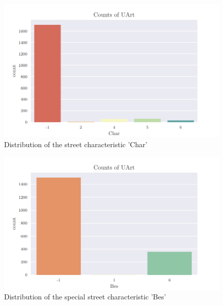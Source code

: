 \documentclass[a4paper,headsepline,footsepline,fontsize=11pt,BCOR=12mm,DIV=12]{report}
\begin{document}
\begin{appendices}
\begin{figure}[h]
	\centering
	\includegraphics[scale=1]{../CorrAnalysis/data/BAYSIS/02_matched/plots/baysis_matched_count_Char}
	\caption{Distribution of the street characteristic 'Char'}
	\label{img:appendix_baysis_matched_Char}
\end{figure}

\begin{figure}[h]
	\centering
	\includegraphics[scale=1]{../CorrAnalysis/data/BAYSIS/02_matched/plots/baysis_matched_count_Bes}
	\caption{Distribution of the special street characteristic 'Bes'}
	\label{img:appendix_baysis_matched_Bes}
\end{figure}


\end{appendices}
\end{document}
